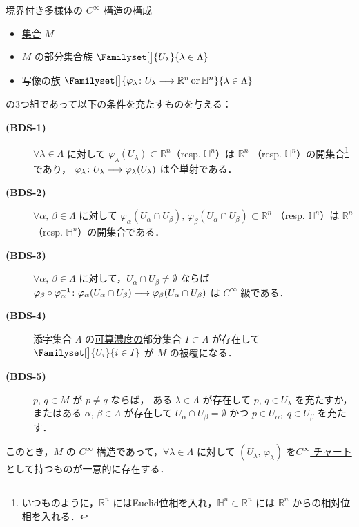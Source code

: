 \documentclass[geometry_main]{subfiles}
\begin{document}
\begin{mylem}[label=lem:cinfty-chart-b]{境界付き多様体の $C^\infty$ 構造の構成}
	\begin{itemize}
		\item \underline{集合} $M$
		\item $M$ の部分集合族 $\Familyset[\big]{U_\lambda}{\lambda \in \Lambda}$
		\item 写像の族 $\Familyset[\big]{\varphi_\lambda \colon U_\lambda \lto \mathbb{R}^n\, \mathrm{or}\, \mathbb{H}^n}{\lambda \in \Lambda}$
	\end{itemize}
	の3つ組であって以下の条件を充たすものを与える：
	\begin{description}
		\item[\textbf{(BDS-1)}]  $\forall \lambda \in \Lambda$ に対して 
		$\varphi_\lambda (U_\lambda) \subset \mathbb{R}^n$（resp. $\mathbb{H}^n$）は $\mathbb{R}^n$ （resp. $\mathbb{H}^n$）の開集合\footnote{いつものように，$\mathbb{R}^n$ にはEuclid位相を入れ，$\mathbb{H}^n \subset \mathbb{R}^n$ には $\mathbb{R}^n$ からの相対位相を入れる．}であり，
		$\varphi_\lambda \colon U_\lambda \longrightarrow \varphi_\lambda (U_\lambda)$
		は全単射である．
		\item[\textbf{(BDS-2)}]  $\forall \alpha,\, \beta \in \Lambda$ に対して $\varphi_\alpha (U_\alpha \cap U_\beta),\, \varphi_\beta (U_\alpha \cap U_\beta) \subset \mathbb{R}^n$ （resp. $\mathbb{H}^n$）は $\mathbb{R}^n$ （resp. $\mathbb{H}^n$）の開集合である．
		\item[\textbf{(BDS-3)}]  $\forall \alpha,\, \beta \in \Lambda$ に対して，$U_\alpha \cap U_\beta \neq \emptyset$ ならば $\varphi_\beta \circ \varphi_\alpha^{-1} \colon \varphi_\alpha (U_\alpha \cap U_\beta) \longrightarrow \varphi_\beta (U_\alpha \cap U_\beta)$ は $C^\infty$ 級である．
		\item[\textbf{(BDS-4)}]  添字集合 $\Lambda$ の\underline{可算濃度の}部分集合 $I \subset \Lambda$ が存在して
		$\Familyset[\big]{U_i}{i \in I}$ が $M$ の被覆になる．
		\item[\textbf{(BDS-5)}]  $p,\, q \in M$ が $p \neq q$ ならば，
		ある $\lambda \in \Lambda$ が存在して $p,\, q \in U_\lambda$ を充たすか，
		またはある $\alpha,\, \beta \in \Lambda$ が存在して $U_\alpha \cap U_\beta = \emptyset$ かつ $p \in U_\alpha,\; q \in U_\beta$ を充たす．
	\end{description}
	このとき，$M$ の $C^\infty$ 構造であって，$\forall \lambda \in \Lambda$ に対して $(U_\lambda,\, \varphi_\lambda)$ を\hyperref[diffmani]{$C^\infty$ チャート}として持つものが一意的に存在する．
\end{mylem}
\end{document}
